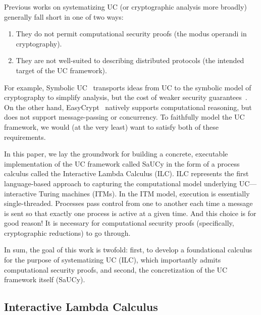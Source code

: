 Previous works on systematizing UC (or cryptographic analysis more broadly)
generally fall short in one of two ways:
\begin{enumerate}[leftmargin=*]
  \item They do not permit computational security proofs (the modus operandi in
    cryptography).
  \item They are not well-suited to describing distributed protocols (the
    intended target of the UC framework).
\end{enumerate}
For example, Symbolic UC~\cite{bohl2016symbolic} transports ideas from UC to the
symbolic model of cryptography to simplify analysis, but the cost of weaker
security guarantees~\cite{cortier2011survey}. On the other hand,
EasyCrypt~\cite{barthe2011computer} natively supports computational reasoning,
but does not support message-passing or concurrency. To faithfully model the UC
framework, we would (at the very least) want to satisfy both of these
requirements.

In this paper, we lay the groundwork for building a concrete, executable
implementation of the UC framework called SaUCy in the form of a process
calculus called the Interactive Lambda Calculus (ILC). ILC represents the first
language-based approach to capturing the computational model underlying
UC---interactive Turing machines (ITMs). In the ITM model, execution is
essentially single-threaded. Processes pass control from one to another each
time a message is sent so that exactly one process is active at a given
time. And this choice is for good reason! It is necessary for computational
security proofs (specifically, cryptographic reductions) to go through.

In sum, the goal of this work is twofold: first, to develop a foundational
calculus for the purpose of systematizing UC (ILC), which importantly admits
computational security proofs, and second, the concretization of the UC
framework itself (SaUCy).

\subsection{Interactive Lambda Calculus}

